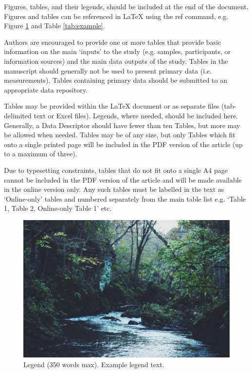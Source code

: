 \documentclass[fleqn,10pt]{wlscirep}
\begin{document}
Figures, tables, and their legends, should be included at the end of the document.
Figures and tables can be referenced in \LaTeX{} using the ref command, e.g. Figure
\ref{fig:stream} and Table \ref{tab:example}.

Authors are encouraged to provide one or more tables that provide basic information on
the main ‘inputs’ to the study (e.g. samples, participants, or information sources) and
the main data outputs of the study. Tables in the manuscript should generally not be
used to present primary data (i.e. measurements). Tables containing primary data should
be submitted to an appropriate data repository.

Tables may be provided within the \LaTeX{} document or as separate files (tab-delimited
text or Excel files). Legends, where needed, should be included here. Generally, a Data
Descriptor should have fewer than ten Tables, but more may be allowed when needed.
Tables may be of any size, but only Tables which fit onto a single printed page will be
included in the PDF version of the article (up to a maximum of three).

Due to typesetting constraints, tables that do not fit onto a single A4 page cannot be
included in the PDF version of the article and will be made available in the online
version only. Any such tables must be labelled in the text as ‘Online-only’ tables and
numbered separately from the main table list e.g. ‘Table 1, Table 2, Online-only Table
1’ etc.

\begin{figure}[ht]
\centering
\includegraphics[width=\linewidth]{stream}
\caption{Legend (350 words max). Example legend text.}
\label{fig:stream}
\end{figure}
\end{document}
